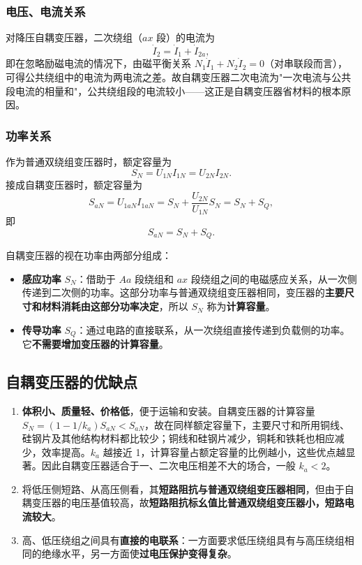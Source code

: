 \subsubsection{电压、电流关系}
对降压自耦变压器，二次绕组（$ax$ 段）的电流为
\begin{equation}
\dot I_{2}=\dot I_1+\dot I_{2a},
\end{equation}
即在忽略励磁电流的情况下，由磁平衡关系 $N_1\dot I_1+N_2\dot I_2=0$（对串联段而言），可得公共绕组中的电流为两电流之差。故自耦变压器二次电流为"一次电流与公共段电流的相量和"，公共绕组段的电流较小——这正是自耦变压器省材料的根本原因。

\subsubsection{功率关系}
作为普通双绕组变压器时，额定容量为
\begin{equation}
S_N=U_{1N}I_{1N}=U_{2N}I_{2N}.
\end{equation}
接成自耦变压器时，额定容量为
\begin{equation}
S_{aN}=U_{1aN}I_{1aN}=S_N+\frac{U_{2N}}{U_{1N}}S_N=S_N+S_Q ,
\end{equation}
即
\begin{equation}
S_{aN}=S_N+S_Q .
\end{equation}


自耦变压器的视在功率由两部分组成：
\begin{itemize}
  \item \textbf{感应功率} $S_N$：借助于 $Aa$ 段绕组和 $ax$ 段绕组之间的电磁感应关系，从一次侧传递到二次侧的功率。这部分功率与普通双绕组变压器相同，变压器的\textbf{主要尺寸和材料消耗由这部分功率决定}，所以 $S_N$ 称为\textbf{计算容量}。
  \item \textbf{传导功率} $S_Q$：通过电路的直接联系，从一次绕组直接传递到负载侧的功率。它\textbf{不需要增加变压器的计算容量}。
\end{itemize}

\subsection{自耦变压器的优缺点}
\begin{enumerate}
  \item \textbf{体积小、质量轻、价格低}，便于运输和安装。自耦变压器的计算容量 $S_N=(1-1/k_a)S_{aN}<S_{aN}$，故在同样额定容量下，主要尺寸和所用铜线、硅钢片及其他结构材料都比较少；铜线和硅钢片减少，铜耗和铁耗也相应减少，效率提高。$k_a$ 越接近 1，计算容量占额定容量的比例越小，这些优点越显著。因此自耦变压器适合于一、二次电压相差不大的场合，一般 $k_a<2$。
  \item 将低压侧短路、从高压侧看，其\textbf{短路阻抗与普通双绕组变压器相同}，但由于自耦变压器的电压基值较高，故\textbf{短路阻抗标幺值比普通双绕组变压器小，短路电流较大}。
  \item 高、低压绕组之间具有\textbf{直接的电联系}：一方面要求低压绕组具有与高压绕组相同的绝缘水平，另一方面使\textbf{过电压保护变得复杂}。
\end{enumerate}

